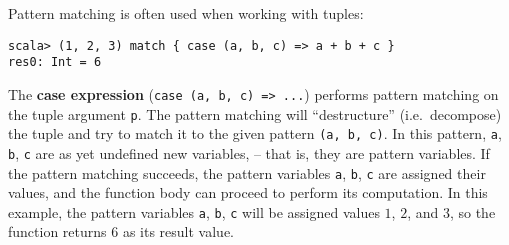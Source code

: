 Pattern matching is often used when working with tuples:
\begin{lstlisting}
scala> (1, 2, 3) match { case (a, b, c) => a + b + c }
res0: Int = 6
\end{lstlisting}
The \textbf{case expression} (\lstinline!case (a, b, c) => ...!)
performs pattern matching on the tuple argument \lstinline!p!.
The pattern matching will ``destructure'' (i.e.~decompose) the
tuple and try to match it to the given pattern \lstinline!(a, b, c)!.
In this pattern, \lstinline!a!,
\lstinline!b!, \lstinline!c!
are as yet undefined new variables, – that is, they are pattern
variables. If the pattern matching succeeds, the pattern variables
\lstinline!a!, \lstinline!b!,
\lstinline!c! are assigned
their values, and the function body can proceed to perform its computation.
In this example, the pattern variables \lstinline!a!,
\lstinline!b!, \lstinline!c!
will be assigned values $1$, $2$, and $3$, so the function returns
$6$ as its result value.

